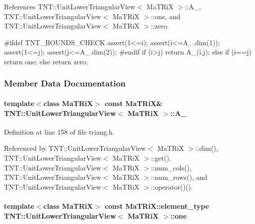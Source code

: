 References TNT::UnitLowerTriangularView$<$ MaTRiX $>$::A\_\-, TNT::UnitLowerTriangularView$<$ MaTRiX $>$::one, and TNT::UnitLowerTriangularView$<$ MaTRiX $>$::zero.




\begin{DoxyCode}
    {
#ifdef TNT_BOUNDS_CHECK
        assert(1<=i);
        assert(i<=A_.dim(1));
        assert(1<=j);
        assert(j<=A_.dim(2));
#endif
        if (i>j)
            return A_(i,j);
        else if (i==j)
            return one;
        else 
            return zero;
    }
\end{DoxyCode}




\subsubsection{Member Data Documentation}
\paragraph[{A\_\-}]{\setlength{\rightskip}{0pt plus 5cm}template$<$class MaTRiX$>$ const MaTRiX\& {\bf TNT::UnitLowerTriangularView}$<$ MaTRiX $>$::{\bf A\_\-}}\hfill\label{class_t_n_t_1_1_unit_lower_triangular_view_a85e3f34ac958e6279b90730a3400111e}


Definition at line 158 of file triang.h.



Referenced by TNT::UnitLowerTriangularView$<$ MaTRiX $>$::dim(), TNT::UnitLowerTriangularView$<$ MaTRiX $>$::get(), TNT::UnitLowerTriangularView$<$ MaTRiX $>$::num\_\-cols(), TNT::UnitLowerTriangularView$<$ MaTRiX $>$::num\_\-rows(), and TNT::UnitLowerTriangularView$<$ MaTRiX $>$::operator()().

\paragraph[{one}]{\setlength{\rightskip}{0pt plus 5cm}template$<$class MaTRiX$>$ const MaTRiX::element\_\-type {\bf TNT::UnitLowerTriangularView}$<$ MaTRiX $>$::{\bf one}}\hfill\label{class_t_n_t_1_1_unit_lower_triangular_view_a1e4983e587ea9fda68596ab096261fa0}


